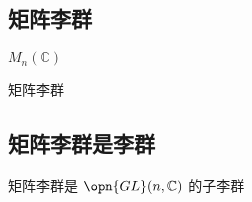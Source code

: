 
\begin{issues}
\issueDraft
\end{issues}


\subsection{矩阵李群}

$M_n(\mathbb{C})$

\begin{definition}{矩阵李群}

\end{definition}


\subsection{矩阵李群是李群}

\begin{theorem}{}

矩阵李群是 $\opn{GL}(n, \mathbb{C})$ 的子李群

\end{theorem}